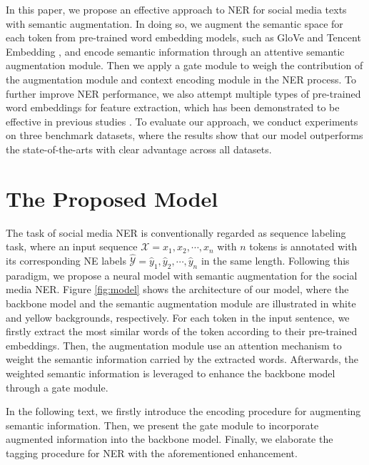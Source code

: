 \documentclass[11pt,a4paper]{article}
\begin{document}
In this paper, we propose an effective approach to NER for social media texts with semantic augmentation. 
In doing so, we augment the semantic space for each token from pre-trained word embedding models, such as GloVe \cite{DBLP:conf/emnlp/PenningtonSM14} and Tencent Embedding \cite{DBLP:conf/naacl/SongSLZ18}, and encode semantic information through an 
attentive semantic
augmentation module.
Then we apply a gate module to weigh the contribution of the augmentation module and context encoding module in the NER process. 
To further improve NER performance, we also attempt multiple types of pre-trained word embeddings for feature extraction, which has been demonstrated to be effective in previous studies \cite{DBLP:conf/coling/AkbikBV18,DBLP:conf/emnlp/JieL19,DBLP:conf/naacl/KasaiFFRR19,DBLP:conf/aaai/KimKK19,DBLP:journals/corr/abs-1911-04474}.
To evaluate our approach, we conduct experiments on three benchmark datasets, where the results show that our model outperforms the state-of-the-arts with clear advantage across all datasets.







\section{The Proposed Model}

The task of social media NER is conventionally regarded as sequence labeling task, where an input sequence $\mathcal{X} = x_1, x_2, \cdots, x_n$ with $n$ tokens is annotated with its corresponding NE labels ${\widehat{\mathcal{Y}}} = \widehat{y}_1, \widehat{y}_2, \cdots, \widehat{y}_n$ in the same length.
Following this paradigm, we propose a neural model with semantic augmentation for the social media NER.
Figure \ref{fig:model} shows the architecture of our model, where the backbone model and the semantic augmentation module are illustrated in white and yellow backgrounds, respectively.
For each token in the input sentence, we firstly extract the most similar words of the token according to their pre-trained embeddings. 
Then, the augmentation module use an attention mechanism to weight the semantic information carried by the extracted words.
Afterwards, the weighted semantic information is leveraged to enhance the backbone model through a gate module.

In the following text, we firstly introduce the encoding procedure for augmenting semantic information.
Then, we present the gate module to incorporate augmented information into the backbone model.
Finally, we elaborate the tagging procedure for NER with the aforementioned enhancement. 
\end{document}
